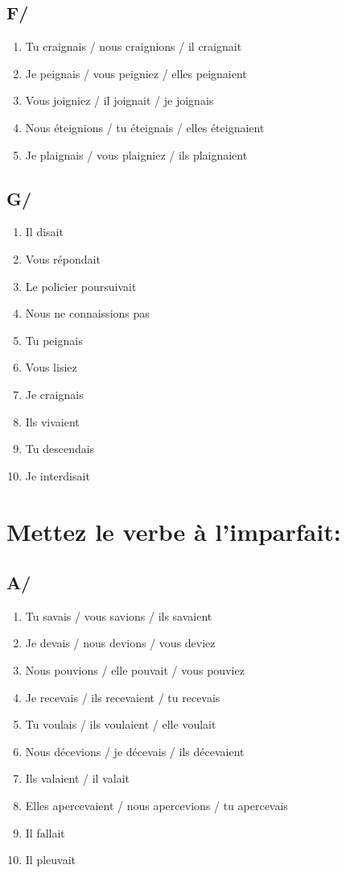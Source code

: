 \subsection{F/}

\begin{enumerate}
    \item Tu craignais / nous craignions / il craignait
    \item Je peignais / vous peigniez / elles peignaient
    \item Vous joigniez / il joignait / je joignais
    \item Nous éteignions / tu éteignais / elles éteignaient
    \item Je plaignais / vous plaigniez / ils plaignaient
\end{enumerate}

\subsection{G/}

\begin{enumerate}
    \item Il disait
    \item Vous répondait
    \item Le policier poursuivait
    \item Nous ne connaissions pas
    \item Tu peignais 
    \item Vous lisiez 
    \item Je craignais 
    \item Ils vivaient
    \item Tu descendais 
    \item Je interdisait
\end{enumerate}

\section{Mettez le verbe à l'imparfait:}

\subsection{A/}

\begin{enumerate}
    \item Tu savais / vous savions / ils savaient
    \item Je devais / nous devions / vous deviez
    \item Nous pouvions / elle pouvait / vous pouviez
    \item Je recevais / ils recevaient / tu recevais 
    \item Tu voulais / ils voulaient / elle voulait 
    \item Nous décevions / je décevais / ils décevaient
    \item Ils valaient / il valait
    \item Elles apercevaient / nous apercevions / tu apercevais
    \item Il fallait
    \item Il pleuvait
\end{enumerate}

